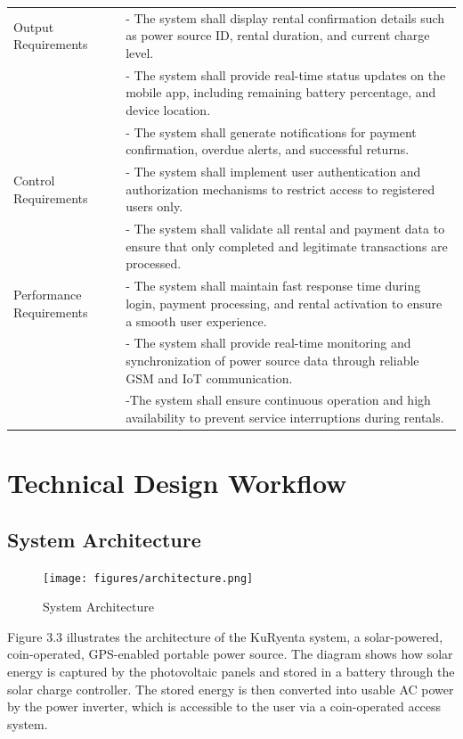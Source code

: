 {\begin{longtable}{p{4cm} p{9cm}}
	Output Requirements & - The system shall display rental confirmation details such as power source ID, rental duration, and current charge level. \\
	& - The system shall provide real-time status updates on the mobile app, including remaining battery percentage, and device location. \\
	& - The system shall generate notifications for payment confirmation, overdue alerts, and successful returns. \\
	\midrule
	
	Control Requirements & - The system shall implement user authentication and authorization mechanisms to restrict access to registered users only. \\
	& - The system shall validate all rental and payment data to ensure that only completed and legitimate transactions are processed. \\
	\midrule
	
	Performance Requirements & - The system shall maintain fast response time during login, payment processing, and rental activation to ensure a smooth user experience. \\
	& - The system shall provide real-time monitoring and synchronization of power source data through reliable GSM and IoT communication.\\
	& -The system shall ensure continuous operation and high availability to prevent service interruptions during rentals. \\
\end{longtable} 

\section{Technical Design Workflow}
\subsection{System  Architecture}

\begin{figure}[H]
	\centering
	\caption{System Architecture}
	\label{fig:architecture}
	\texttt{[image: figures/architecture.png]}
\end{figure}

Figure 3.3 illustrates the architecture of the KuRyenta system, a solar-powered, coin-operated, GPS-enabled portable power source. The diagram shows how solar energy is captured by the photovoltaic panels and stored in a  battery through the solar charge controller. The stored energy is then converted into usable AC power by the power inverter, which is accessible to the user via a coin-operated access system.

}
